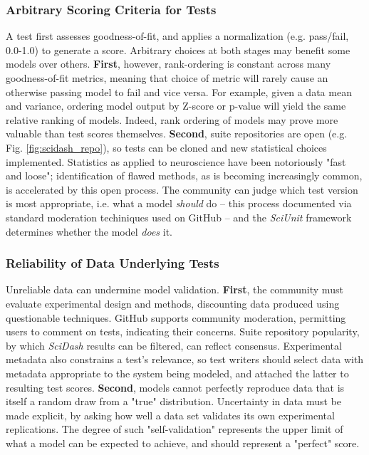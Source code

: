 \documentclass[11pt,letterpaper]{article}
\begin{document}
\subsubsection{Arbitrary Scoring Criteria for Tests}
A test first assesses goodness-of-fit, and applies a normalization (e.g. pass/fail, 0.0-1.0) to generate a score.  Arbitrary choices at both stages may benefit some models over others.  \textbf{First}, however, rank-ordering is constant across many goodness-of-fit metrics, meaning that choice of metric will rarely cause an otherwise passing model to fail and vice versa.  For example, given a data mean and variance, ordering model output by Z-score or p-value will yield the same relative ranking of models. Indeed, rank ordering of models may prove more valuable than test scores themselves. \textbf{Second}, suite repositories are open (e.g. Fig. \ref{fig:scidash_repo}), so tests can be cloned and new statistical choices implemented. Statistics as applied to neuroscience have been notoriously "fast and loose"; identification of flawed methods, as is becoming increasingly common\cite{button_power_2013,kriegeskorte_circular_2009,galbraith_study_2010,fish_fmri_url}, is accelerated by this open process. The community can judge which test version is most appropriate, i.e. what a model \textit{should} do -- this process documented via standard moderation techiniques used on GitHub -- and the \textit{SciUnit} framework determines whether the model \textit{does} it.  

\subsubsection{Reliability of Data Underlying Tests}
Unreliable data can undermine model validation. \textbf{First}, the community must evaluate experimental design and methods, discounting data produced using questionable techniques.  GitHub supports community moderation, permitting users to comment on tests, indicating their concerns.  Suite repository popularity, by which \textit{SciDash} results can be filtered, can reflect consensus.  Experimental metadata also constrains a test's relevance, so test writers should select data with metadata appropriate to the system being modeled, and attached the latter to resulting test scores.  \textbf{Second}, models cannot perfectly reproduce data that is itself a random draw from a "true" distribution.  Uncertainty in data must be made explicit, by asking how well a data set validates its own experimental replications\cite{kriegeskorte_representational_2008}.  The degree of such "self-validation" represents the upper limit of what a model can be expected to achieve, and should represent a "perfect" score.  
\end{document}
